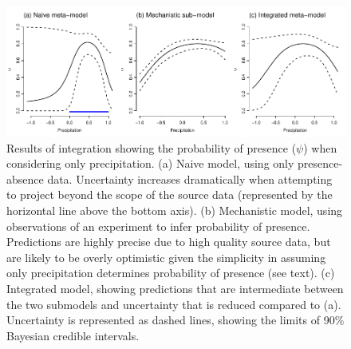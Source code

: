 
\begin{figure}[tb]
	\includegraphics{ex1_precip.pdf}
	\caption{Results of integration showing the probability of presence (\(\psi\)) when considering only precipitation.
	(a) Naive model, using only presence-absence data. Uncertainty increases dramatically when attempting to project beyond the scope of the source data (represented by the horizontal line above the bottom axis).
	(b) Mechanistic model, using observations of an experiment to infer probability of presence. Predictions are highly precise due to high quality source data, but are likely to be overly optimistic given the simplicity in assuming only precipitation determines probability of presence (see text).
	(c) Integrated model, showing predictions that are intermediate between the two submodels and uncertainty that is reduced compared to (a).
	Uncertainty is represented as dashed lines, showing the limits of 90\% Bayesian credible intervals.}
	\label{fig:ex1_precip}
\end{figure}




